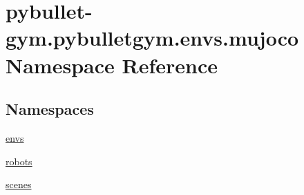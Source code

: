 \hypertarget{namespacepybullet-gym_1_1pybulletgym_1_1envs_1_1mujoco}{}\section{pybullet-\/gym.pybulletgym.\+envs.\+mujoco Namespace Reference}
\label{namespacepybullet-gym_1_1pybulletgym_1_1envs_1_1mujoco}
\subsection*{Namespaces}
\begin{DoxyCompactItemize}
\item 
 \hyperlink{namespacepybullet-gym_1_1pybulletgym_1_1envs_1_1mujoco_1_1envs}{envs}
\item 
 \hyperlink{namespacepybullet-gym_1_1pybulletgym_1_1envs_1_1mujoco_1_1robots}{robots}
\item 
 \hyperlink{namespacepybullet-gym_1_1pybulletgym_1_1envs_1_1mujoco_1_1scenes}{scenes}
\end{DoxyCompactItemize}
